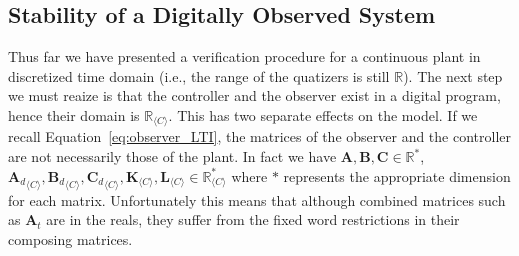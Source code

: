 \documentclass[sigconf]{llncs}
\newcommand{\mat}[1]{\boldsymbol{#1}}
\begin{document}
\subsection{Stability of a Digitally Observed System}\label{sec:cof_fwl_stability}

Thus far we have presented a verification procedure for a continuous plant
in discretized time domain (i.e., the range of the quatizers is still
$\mathbb{R}$).  The next step we must reaize is that the controller and the
observer exist in a digital program, hence their domain is
$\mathbb{R}_{\langle C \rangle}$.  This has two separate effects on the
model.  If we recall Equation~\eqref{eq:observer_LTI}, the matrices of the observer
and the controller are not necessarily those of the plant.  In fact we have
$\mat{A},\mat{B},\mat{C} \in \mathbb{R}^*$, ${\mat{A}_d}_{\langle C
\rangle},{\mat{B}_d}_{\langle C \rangle},{\mat{C}_d}_{\langle C \rangle},
\mat{K}_{\langle C \rangle}, \mat{L}_{\langle C \rangle} \in
\mathbb{R}_{\langle C \rangle}^*$ where $*$ represents the appropriate
dimension for each matrix.  Unfortunately this means that although combined
matrices such as $\mat{A}_t$ are in the reals, they suffer from the fixed
word restrictions in their composing matrices.
\end{document}
